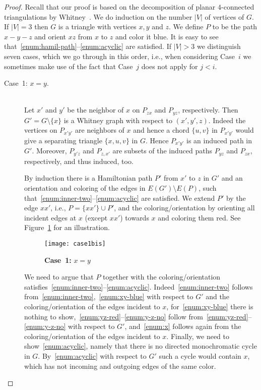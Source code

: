 \documentclass[a4paper,10pt]{article}
\theoremstyle{plain}
\begin{document}
\begin{proof}
 Recall that our proof is based on the decomposition of planar $4$-connected triangulations by Whitney~\cite{Whi-32}. We do induction on the number $|V|$ of vertices of $G$. 
 If $|V|=3$ then $G$ is a triangle with vertices $x,y$ and $z$.
 We define $P$ to be the path $x-y-z$ and orient $xz$ from $x$ to $z$ and color it blue.
 It is easy to see that~\ref{enum:hamil-path}--\ref{enum:acyclic} are satisfied.
 If $|V| > 3$ we distinguish seven cases, which we go through in this order, i.e., when considering Case~$i$ we sometimes make use of the fact that Case~$j$ does not apply for $j < i$.
 
 \begin{description}
  \item[Case~1: $x=y$.]{\ \\}
   Let $x'$ and $y'$ be the neighbor of $x$ on $P_{zx}$ and $P_{yz}$, respectively.
   Then $G' = G \setminus \{x\}$ is a Whitney graph with respect to $(x',y',z)$.
   Indeed the vertices on $P_{x'y'}$ are neighbors of $x$ and hence a chord $\{u,v\}$ in $P_{x'y'}$ would give a separating triangle $\{x,u,v\}$ in $G$.
   Hence $P_{x'y'}$ is an induced path in $G'$.
   Moreover, $P_{y'z}$ and $P_{z,x'}$ are subsets of the induced paths $P_{yz}$ and $P_{zx}$, respectively, and thus induced, too.
 
   By induction there is a Hamiltonian path $P'$ from $x'$ to $z$ in $G'$ and an orientation and coloring of the edges in $E(G') \setminus E(P)$, such that~\ref{enum:inner-two}--\ref{enum:acyclic} are satisfied. We extend $P'$ by the edge $xx'$, i.e., $P = \{xx'\} \cup P'$, and the coloring/orientation by orienting all incident edges at $x$ (except $xx'$) towards $x$ and coloring them red. See Figure~\ref{fig:case1} for an illustration.
 
   \begin{figure}[tb]
    \centering
    \texttt{[image: case1bis]}
    \caption{\textbf{Case~1:} $x=y$}
    \label{fig:case1}
   \end{figure}

   We need to argue that $P$ together with the coloring/orientation satisfies~\ref{enum:inner-two}--\ref{enum:acyclic}. Indeed~\ref{enum:inner-two} follows from~\ref{enum:inner-two},~\ref{enum:xy-blue} with respect to $G'$ and the coloring/orientation of the edges incident to $x$, for~\ref{enum:xy-blue} there is nothing to show,~\ref{enum:yz-red}--\ref{enum:y-z-no} follow from~\ref{enum:yz-red}--\ref{enum:y-z-no} with respect to $G'$, and~\ref{enum:x} follows again from the coloring/orientation of the edges incident to $x$. Finally, we need to show~\ref{enum:acyclic}, namely that there is no directed monochromatic cycle in $G$. By~\ref{enum:acyclic} with respect to $G'$ such a cycle would contain $x$, which has not incoming and outgoing edges of the same color.
  

\end{description}
\end{proof}
\end{document}
